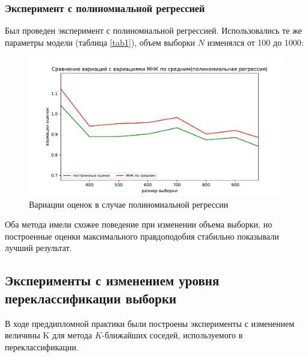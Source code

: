 \subsubsection{Эксперимент с полиномиальной регрессией}
Был проведен эксперимент с полиномиальной регрессией. Использовались те же параметры модели (таблица \ref{tab1}), объем выборки $N$ изменялся от 100 до 1000:
\begin{figure}[h!]
    \centering
    \includegraphics[width=150mm]{../images/polynomial.pdf}
    \caption{Вариации оценок в случае полиномиальной регрессии\label{overflow}}
    \label{pic3}
\end{figure}

Оба метода имели схожее поведение при изменении объема выборки, но построенные оценки максимального правдоподобия стабильно показывали лучший результат.

\newpage
\subsection{Эксперименты с изменением уровня переклассификации выборки}\label{ss3_3_1}
В ходе преддипломной практики были построены эксперименты с изменением величины K для метода $K$-ближайших соседей, используемого в переклассификации.  

